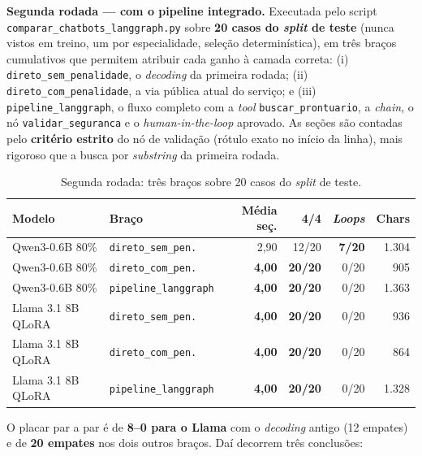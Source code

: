 \documentclass[12pt,a4paper]{article}
\begin{document}
\medskip
\noindent\textbf{Segunda rodada --- com o pipeline integrado.} Executada pelo
script \texttt{comparar\_chatbots\_langgraph.py} sobre \textbf{20 casos do
\emph{split} de teste} (nunca vistos em treino, um por especialidade, seleção
determinística), em três braços cumulativos que permitem atribuir cada ganho à
camada correta: (i) \texttt{direto\_sem\_penalidade}, o \emph{decoding} da
primeira rodada; (ii) \texttt{direto\_com\_penalidade}, a via pública atual do
serviço; e (iii) \texttt{pipeline\_langgraph}, o fluxo completo com a
\emph{tool} \texttt{buscar\_prontuario}, a \emph{chain}, o nó
\texttt{validar\_seguranca} e o \emph{human-in-the-loop} aprovado. As seções são
contadas pelo \textbf{critério estrito} do nó de validação (rótulo exato no
início da linha), mais rigoroso que a busca por \emph{substring} da primeira
rodada.

\begin{table}[htbp]
\centering
\caption{Segunda rodada: três braços sobre 20 casos do \emph{split} de teste.}
\label{tab:20q2}
\footnotesize
\begin{tabularx}{\textwidth}{X l r r r r}
\toprule
\textbf{Modelo} & \textbf{Braço} & \textbf{Média seç.} & \textbf{4/4} & \textbf{\emph{Loops}} & \textbf{Chars} \\
\midrule
Qwen3-0.6B 80\%     & \texttt{direto\_sem\_pen.}  & 2,90          & 12/20          & \textbf{7/20} & 1.304 \\
Qwen3-0.6B 80\%     & \texttt{direto\_com\_pen.}  & \textbf{4,00} & \textbf{20/20} & 0/20          &   905 \\
Qwen3-0.6B 80\%     & \texttt{pipeline\_langgraph}& \textbf{4,00} & \textbf{20/20} & 0/20          & 1.363 \\
Llama 3.1 8B QLoRA  & \texttt{direto\_sem\_pen.}  & \textbf{4,00} & \textbf{20/20} & 0/20          &   936 \\
Llama 3.1 8B QLoRA  & \texttt{direto\_com\_pen.}  & \textbf{4,00} & \textbf{20/20} & 0/20          &   864 \\
Llama 3.1 8B QLoRA  & \texttt{pipeline\_langgraph}& \textbf{4,00} & \textbf{20/20} & 0/20          & 1.328 \\
\bottomrule
\end{tabularx}
\end{table}

O placar par a par é de \textbf{8--0 para o Llama} com o \emph{decoding} antigo
(12 empates) e de \textbf{20 empates} nos dois outros braços. Daí decorrem três
conclusões:
\end{document}
